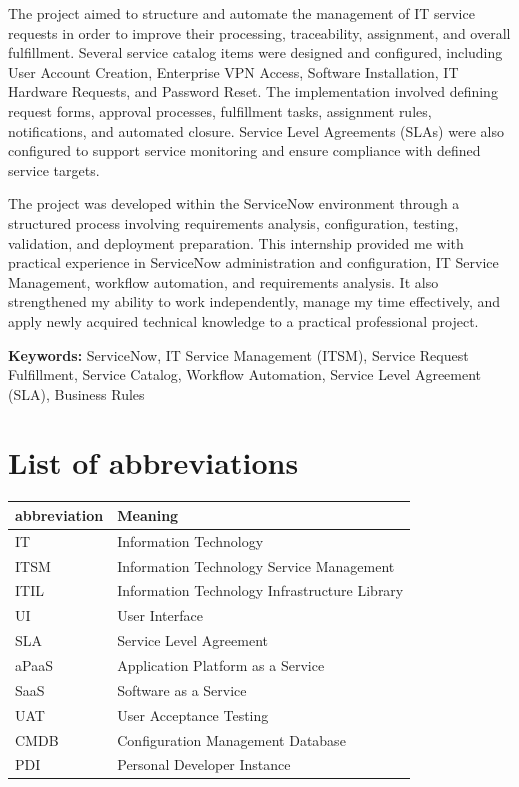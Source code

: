 \documentclass[12pt,a4paper]{report}
\begin{document}
The project aimed to structure and automate the management of IT service requests in order to improve 
their processing, traceability, assignment, and overall fulfillment. Several service catalog items
were designed and configured, including User Account Creation, Enterprise VPN Access, Software Installation, 
IT Hardware Requests, and Password Reset. The implementation involved defining request forms, approval processes, 
fulfillment tasks, assignment rules, notifications, and automated closure. 
Service Level Agreements (SLAs) were also configured to support service monitoring and ensure compliance with defined service targets.

The project was developed within the ServiceNow environment through a structured process involving requirements 
analysis, configuration, testing, validation, and deployment preparation. This internship provided me 
with practical experience in ServiceNow administration and configuration, IT Service Management, workflow automation, and 
requirements analysis. It also strengthened my ability to work independently, manage my time effectively, 
and apply newly acquired technical knowledge to a practical professional project.

\noindent\textbf{Keywords:} ServiceNow, IT Service Management (ITSM), Service Request Fulfillment, Service Catalog, Workflow Automation, Service Level Agreement (SLA), Business Rules

\chapter*{List of abbreviations}
\begin{tabular}{|l|l|}
\hline
\textbf{abbreviation} & \textbf{Meaning} \\
\hline
IT  & Information Technology \\
\hline
ITSM  & Information Technology Service Management \\
\hline
ITIL  & Information Technology Infrastructure Library\\
\hline
UI  & User Interface \\
\hline
SLA  & Service Level Agreement \\
\hline
aPaaS  & Application Platform as a Service \\
\hline
SaaS  & Software as a Service \\
\hline
UAT  & User Acceptance Testing \\
\hline
CMDB  & Configuration Management Database \\
\hline
PDI  & Personal Developer Instance \\
\hline
\end{tabular}
\end{document}
